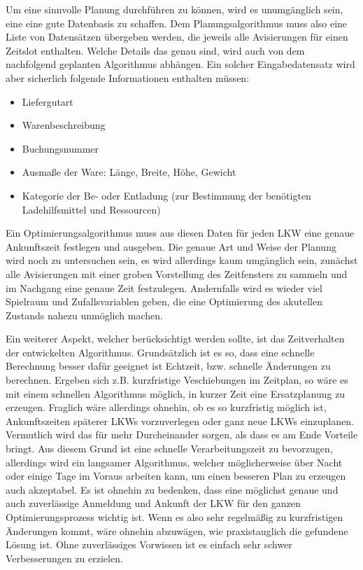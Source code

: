 Um eine sinnvolle Planung durchführen zu können, wird es unumgänglich sein, eine eine gute Datenbasis zu schaffen. Dem Planungsalgorithmus muss also eine Liste von Datensätzen übergeben werden, die jeweils alle Avisierungen für einen Zeitslot enthalten. Welche Details das genau sind, wird auch von dem nachfolgend geplanten Algorithmus abhängen. Ein solcher Eingabedatensatz wird aber sicherlich folgende Informationen enthalten müssen:
\begin{itemize}
    \item Liefergutart
    \item Warenbeschreibung
    \item Buchungsnummer
    \item Ausmaße der Ware: Länge, Breite, Höhe, Gewicht
    \item Kategorie der Be- oder Entladung (zur Bestimmung der benötigten Ladehilfsmittel und Ressourcen)
\end{itemize}
Ein Optimierungsalgorithmus muss aus diesen Daten für jeden LKW eine genaue Ankunftszeit festlegen und ausgeben. Die genaue Art und Weise der Planung wird noch zu untersuchen sein, es wird allerdings kaum umgänglich sein, zunächst alle Avisierungen mit einer groben Vorstellung des Zeitfensters zu sammeln und im Nachgang eine genaue Zeit festzulegen. Andernfalls wird es wieder viel Spielraum und Zufallsvariablen geben, die eine Optimierung des akutellen Zustands nahezu unmöglich machen.

Ein weiterer Aspekt, welcher berücksichtigt werden sollte, ist das Zeitverhalten der entwickelten Algorithmus. Grundsätzlich ist es so, dass eine schnelle Berechnung besser dafür geeignet ist Echtzeit, bzw. schnelle Änderungen zu berechnen. Ergeben sich z.B. kurzfristige Veschiebungen im Zeitplan, so wäre es mit einem schnellen Algorithmus möglich, in kurzer Zeit eine Ersatzplanung zu erzeugen. Fraglich wäre allerdings ohnehin, ob es so kurzfristig möglich ist, Ankunftszeiten späterer LKWs vorzuverlegen oder ganz neue LKWs einzuplanen. Vermutlich wird das für mehr Durcheinander sorgen, als dass es am Ende Vorteile bringt. Aus diesem Grund ist eine schnelle Verarbeitungszeit zu bevorzugen, allerdings wird ein langsamer Algorithmus, welcher möglicherweise über Nacht oder einige Tage im Voraus arbeiten kann, um einen besseren Plan zu erzeugen auch akzeptabel. Es ist ohnehin zu bedenken, dass eine möglichst genaue und auch zuverlässige Anmeldung und Ankunft der LKW für den ganzen Optimierungsprozess wichtig ist. Wenn es also sehr regelmäßig zu kurzfristigen Änderungen kommt, wäre ohnehin abzuwägen, wie praxistauglich die gefundene Lösung ist. Ohne zuverlässiges Vorwissen ist es einfach sehr schwer Verbesserungen zu erzielen.


